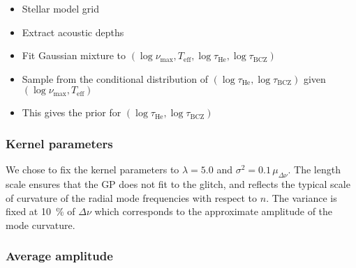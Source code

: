 \documentclass[linenumbers,modern]{aastex631dm}
\newcommand{\helium}{\mathrm{He}}
\newcommand{\bcz}{\mathrm{BCZ}}
\begin{document}
\begin{itemize}
    \item Stellar model grid
    \item Extract acoustic depths
    \item Fit Gaussian mixture to \((\log\nu_\mathrm{max}, T_\mathrm{eff},
        \log\tau_\helium, \log\tau_\bcz)\)
    \item Sample from the conditional distribution of \((\log\tau_\helium,
        \log\tau_\bcz)\) given \((\log\nu_\mathrm{max}, T_\mathrm{eff})\)
    \item This gives the prior for \((\log\tau_\helium, \log\tau_\bcz)\)
\end{itemize}


\subsubsection{Kernel parameters}\label{sec:kernel-params}

We chose to fix the kernel parameters to \(\lambda = 5.0\) and \(\sigma^2 =
0.1 \, \mu_{\Delta\nu}\). The length scale ensures that the GP does not fit to
the glitch, and reflects the typical scale of curvature of the radial mode
frequencies with respect to \(n\). The variance is fixed at \SI{10}{\percent}
of \(\Delta\nu\) which corresponds to the approximate amplitude of the mode
curvature.


\subsubsection{Average amplitude}\label{sec:avg-amp}
\end{document}
